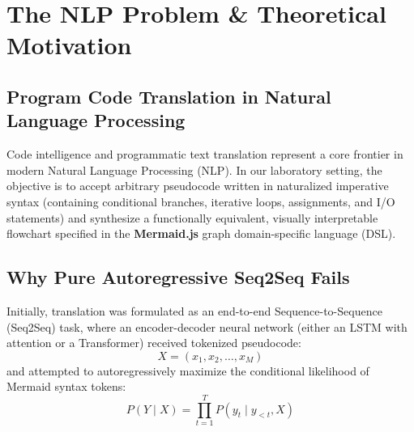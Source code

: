 \documentclass[11pt,a4paper]{article}
\begin{document}
\tableofcontents
\newpage

\section{The NLP Problem \& Theoretical Motivation}

\subsection{Program Code Translation in Natural Language Processing}
Code intelligence and programmatic text translation represent a core frontier in modern Natural Language Processing (NLP). In our laboratory setting, the objective is to accept arbitrary pseudocode written in naturalized imperative syntax (containing conditional branches, iterative loops, assignments, and I/O statements) and synthesize a functionally equivalent, visually interpretable flowchart specified in the \textbf{Mermaid.js} graph domain-specific language (DSL).

\subsection{Why Pure Autoregressive Seq2Seq Fails}
Initially, translation was formulated as an end-to-end Sequence-to-Sequence (Seq2Seq) task, where an encoder-decoder neural network (either an LSTM with attention or a Transformer) received tokenized pseudocode:
\begin{equation}
X = (x_1, x_2, \dots, x_M)
\end{equation}
and attempted to autoregressively maximize the conditional likelihood of Mermaid syntax tokens:
\begin{equation}
P(Y \mid X) = \prod_{t=1}^{T} P(y_t \mid y_{<t}, X)
\end{equation}
\end{document}
